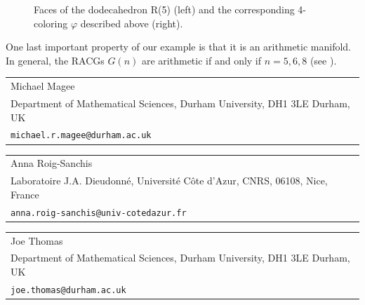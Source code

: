 \documentclass[12pt]{article}
\newcommand{\1}{\mathds{1}}
\begin{document}
\begin{figure}[H]
\captionsetup{width=0.75\textwidth}
\caption{{\small Faces of the dodecahedron R(5) (left) and the corresponding 4-coloring $\varphi$ described above (right).}}
\label{dodecahedron}
\end{figure}


One last important property of our example is that it is an arithmetic manifold. In general, the RACGs $G(n)$ are arithmetic if and only if $n=5,6,8$ (see \cite[Lemma 3.8]{surveyVesnin}).





\begin{tabular}{@{}l@{}}%
Michael Magee \\
Department of Mathematical Sciences, 
Durham University, DH1 3LE Durham, UK \\
\texttt{michael.r.magee@durham.ac.uk}
\end{tabular}

\vspace{1em}

\begin{tabular}{@{}l@{}}%
Anna Roig-Sanchis \\
Laboratoire J.A. Dieudonn\'{e},
Universit\'{e} C\^{o}te d'Azur, CNRS, 06108, Nice, France \\
\texttt{anna.roig-sanchis@univ-cotedazur.fr}
\end{tabular}

\vspace{1em}

\begin{tabular}{@{}l@{}}%
Joe Thomas \\
Department of Mathematical Sciences,
Durham University, DH1 3LE Durham, UK \\
\texttt{joe.thomas@durham.ac.uk}
\end{tabular}
\end{document}
